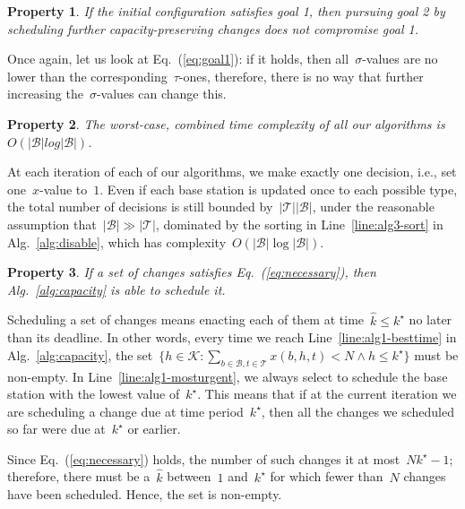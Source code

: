 \documentclass[10pt,journal,cspaper,compsoc]{IEEEtran}
\newcommand{\Eq}[1]{Eq.~(\ref{eq:#1})}
\newcommand{\Alg}[1]{Alg.~\ref{alg:#1}}
\newcommand{\Line}[1]{Line~\ref{line:#1}}
\newtheorem{property}{Property}
\newcommand{\Bc}{\mathcal{B}}
\newcommand{\Kc}{\mathcal{K}}
\newcommand{\Tc}{\mathcal{T}}
\begin{document}
\begin{property}
If the initial configuration satisfies goal 1, then pursuing goal 2 by scheduling further capacity-preserving
changes does not compromise goal 1.
\end{property}
\begin{IEEEproof}
Once again, let us look at \Eq{goal1}: if it holds, then all~$\sigma$-values are no lower than the corresponding~$\tau$-ones,
therefore, there is no way that further increasing the~$\sigma$-values can change this.
\end{IEEEproof}

\begin{property}
\label{prop:complexity}
The worst-case, {\em combined} time complexity of all our algorithms is~$O(|\Bc|log|\Bc|)$.
\end{property}
\begin{IEEEproof}
At each iteration of each of our algorithms, we make exactly one decision, i.e., set one~$x$-value to~$1$.
Even if each base station is updated once to each possible type, the total number of decisions is still
bounded by~$|\Tc||\Bc|$, under the reasonable assumption that~$|\Bc|\gg|\Tc|$, dominated by the sorting in 
\Line{alg3-sort} in \Alg{disable}, which has complexity~$O(|\Bc|\log|\Bc|)$.
\end{IEEEproof}

\begin{property}
\label{prop:feasible}
If a set of changes satisfies \Eq{necessary}, then \Alg{capacity} is able to schedule it.
\end{property}
\begin{IEEEproof}
Scheduling a set of changes means enacting each of them at time~$\hat{k}\leq k^\star$ no later than its deadline.
In other words, every time we reach \Line{alg1-besttime} in \Alg{capacity},
the set~$\{ h\in\Kc: \sum_{b\in\Bc,t\in\Tc} x(b,h,t) < N\wedge h\leq k^\star \}$ must be non-empty.
In \Line{alg1-mosturgent}, we always select
to schedule the base station with the lowest value of~$k^\star$.
This means that if at
the current iteration we are scheduling a change due at time period~$k^\star$, then all
the changes we scheduled so far were due at~$k^\star$ or earlier.

Since \Eq{necessary}
holds, the number of such changes it at most~$Nk^\star-1$;
therefore, there must be a~$\hat{k}$ between~$1$
and~$k^\star$ for which fewer than~$N$ changes have been scheduled. 
Hence, the set is non-empty.
\end{IEEEproof}
\end{document}
